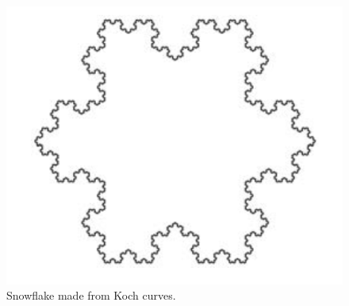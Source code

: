 \begin{figure}[h!]
  \includegraphics[width=\linewidth]{Pictures/snowflake.png}
  \caption{Snowflake made from Koch curves.}
  \label{fig:snowflake}
\end{figure}

